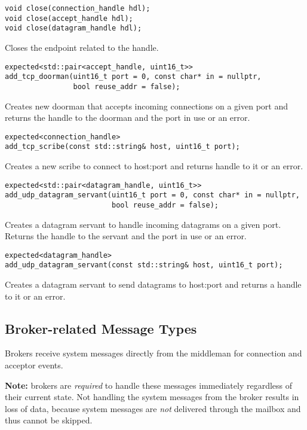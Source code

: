 \begin{lstlisting}
void close(connection_handle hdl);
void close(accept_handle hdl);
void close(datagram_handle hdl);
\end{lstlisting}

Closes the endpoint related to the handle.

\begin{lstlisting}
expected<std::pair<accept_handle, uint16_t>>
add_tcp_doorman(uint16_t port = 0, const char* in = nullptr,
                bool reuse_addr = false);
\end{lstlisting}

Creates new doorman that accepts incoming connections on a given port and
returns the handle to the doorman and the port in use or an error.

\begin{lstlisting}
expected<connection_handle>
add_tcp_scribe(const std::string& host, uint16_t port);
\end{lstlisting}

Creates a new scribe to connect to host:port and returns handle to it or an
error.

\begin{lstlisting}
expected<std::pair<datagram_handle, uint16_t>>
add_udp_datagram_servant(uint16_t port = 0, const char* in = nullptr,
                         bool reuse_addr = false);
\end{lstlisting}

Creates a datagram servant to handle incoming datagrams on a given port.
Returns the handle to the servant and the port in use or an error.

\begin{lstlisting}
expected<datagram_handle>
add_udp_datagram_servant(const std::string& host, uint16_t port);
\end{lstlisting}

Creates a datagram servant to send datagrams to host:port and returns a handle
to it or an error.

\subsection{Broker-related Message Types}

Brokers receive system messages directly from the middleman for connection and
acceptor events.

\textbf{Note:} brokers are \emph{required} to handle these messages immediately
regardless of their current state. Not handling the system messages from the
broker results in loss of data, because system messages are \emph{not}
delivered through the mailbox and thus cannot be skipped.

